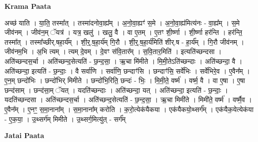 \documentclass[17pt]{extarticle}
\begin{document}
\textbf{Krama Paata} \newline

अच्छ॑ याति । या॒ति॒ तस्मा᳚त् । तस्मा॑दनोवा॒ह्य᳚म् । अ॒नो॒वा॒ह्यꣳ॑ स॒मे । अ॒नो॒वा॒ह्य॑मित्य॑नः - वा॒ह्य᳚म् । स॒मे जीव॑नम् । जीव॑न॒म् ॅयत्र॑ । यत्र॒ खलु॑ । खलु॒ वै । वा ए॒तम् । ए॒तꣳ शी॒र्ष्णा । शी॒र्ष्णा हर॑न्ति । हर॑न्ति॒ तस्मा᳚त् । तस्मा᳚च्छीर्.षहा॒र्य᳚म् । शी॒र्॒.ष॒हा॒र्य॑म् गि॒रौ । शी॒र्॒.ष॒हा॒र्य॑मिति॑ शीर्.ष - हा॒र्य᳚म् । गि॒रौ जीव॑नम् । जीव॑नम॒भि । अ॒भि त्यम् । त्यम् दे॒वम् । दे॒वꣳ स॑वि॒तार᳚म् । स॒वि॒तार॒मिति॑ । इत्यति॑च्छन्दसा । अति॑च्छन्दस॒र्चा । अति॑च्छन्द॒सेत्यति॑ - छ॒न्द॒सा॒ । ऋ॒चा मि॑मीते । मि॒मी॒तेऽति॑च्छन्दाः । अति॑च्छन्दा॒ वै । अति॑च्छन्दा॒ इत्यति॑ - छ॒न्दाः॒ । वै सर्वा॑णि । सर्वा॑णि॒ छन्दाꣳ॑सि । छन्दाꣳ॑सि॒ सर्वे॑भिः । सर्वे॑भिरे॒व । ए॒वैन᳚म् । ए॒न॒म् छन्दो॑भिः । छन्दो॑भिर् मिमीते । छन्दो॑भि॒रिति॒ छन्दः॑ - भिः॒ । मि॒मी॒ते॒ वर्ष्म॑ । वर्ष्म॒ वै । वा ए॒षा । ए॒षा छन्द॑साम् । छन्द॑सा॒म् ॅयत् । यदति॑च्छन्दाः । अति॑च्छन्दा॒ यत् । अति॑च्छन्दा॒ इत्यति॑ - छ॒न्दाः॒ । यदति॑च्छन्दसा । अति॑च्छन्दस॒र्चा । अति॑च्छन्द॒सेत्यति॑ - छ॒न्द॒सा॒ । ऋ॒चा मिमी॑ते । मिमी॑ते॒ वर्ष्म॑ । वर्ष्मै॒व । ए॒वैन᳚म् । ए॒नꣳ॒॒ स॒मा॒नाना᳚म् । स॒मा॒नाना᳚म् करोति । क॒रो॒त्येक॑यैकया । एक॑यैकयो॒थ्सर्ग᳚म् । एक॑यैक॒येत्येक॑या - ए॒क॒या॒ । उ॒थ्सर्ग॑म् मिमीते । उ॒थ्सर्ग॒मित्यु॑त् - सर्ग᳚म् \newline

\textbf{Jatai Paata} \newline
\end{document}
